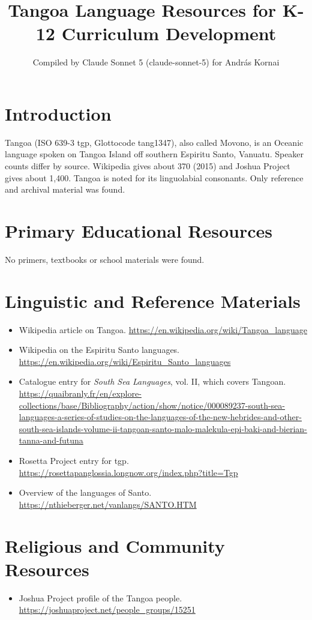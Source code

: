 \documentclass[12pt]{article}
\title{Tangoa Language Resources for K-12 Curriculum Development}
\author{Compiled by Claude Sonnet 5 (claude-sonnet-5) for Andr\'as Kornai}
\date{}
\begin{document}
\maketitle
\section{Introduction}
Tangoa (ISO 639-3 tgp, Glottocode tang1347), also called Movono, is an Oceanic language spoken on Tangoa Island off southern Espiritu Santo, Vanuatu. Speaker counts differ by source. Wikipedia gives about 370 (2015) and Joshua Project gives about 1,400. Tangoa is noted for its linguolabial consonants. Only reference and archival material was found.
\section{Primary Educational Resources}
No primers, textbooks or school materials were found.
\section{Linguistic and Reference Materials}
\begin{itemize}
\item Wikipedia article on Tangoa. \url{https://en.wikipedia.org/wiki/Tangoa_language}
\item Wikipedia on the Espiritu Santo languages. \url{https://en.wikipedia.org/wiki/Espiritu_Santo_languages}
\item Catalogue entry for \emph{South Sea Languages}, vol. II, which covers Tangoan. \url{https://quaibranly.fr/en/explore-collections/base/Bibliography/action/show/notice/000089237-south-sea-languages-a-series-of-studies-on-the-languages-of-the-new-hebrides-and-other-south-sea-islands-volume-ii-tangoan-santo-malo-malekula-epi-baki-and-bierian-tanna-and-futuna}
\item Rosetta Project entry for tgp. \url{https://rosettapanglossia.longnow.org/index.php?title=Tgp}
\item Overview of the languages of Santo. \url{https://nthieberger.net/vanlangs/SANTO.HTM}
\end{itemize}
\section{Religious and Community Resources}
\begin{itemize}
\item Joshua Project profile of the Tangoa people. \url{https://joshuaproject.net/people_groups/15251}
\end{itemize}
\end{document}
